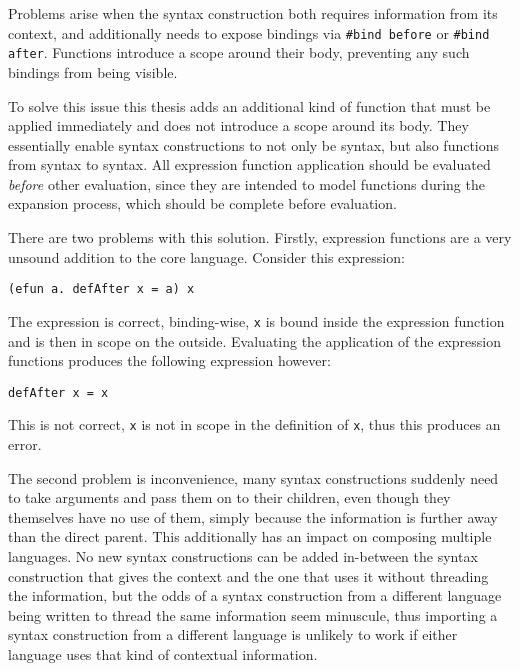 \documentclass{kththesis}
\begin{document}
Problems arise when the syntax construction both requires information from its context, and additionally needs to expose bindings via \texttt{#bind before} or \texttt{#bind after}. Functions introduce a scope around their body, preventing any such bindings from being visible.

To solve this issue this thesis adds an additional kind of function that must be applied immediately and does not introduce a scope around its body. They essentially enable syntax constructions to not only be syntax, but also functions from syntax to syntax. All expression function application should be evaluated \emph{before} other evaluation, since they are intended to model functions during the expansion process, which should be complete before evaluation.

There are two problems with this solution. Firstly, expression functions are a very unsound addition to the core language. Consider this expression:

\begin{verbatim}
(efun a. defAfter x = a) x
\end{verbatim}

The expression is correct, binding-wise, \texttt{x} is bound inside the expression function and is then in scope on the outside. Evaluating the application of the expression functions produces the following expression however:

\begin{verbatim}
defAfter x = x
\end{verbatim}

This is not correct, \texttt{x} is not in scope in the definition of \texttt{x}, thus this produces an error.

The second problem is inconvenience, many syntax constructions suddenly need to take arguments and pass them on to their children, even though they themselves have no use of them, simply because the information is further away than the direct parent. This additionally has an impact on composing multiple languages. No new syntax constructions can be added in-between the syntax construction that gives the context and the one that uses it without threading the information, but the odds of a syntax construction from a different language being written to thread the same information seem minuscule, thus importing a syntax construction from a different language is unlikely to work if either language uses that kind of contextual information.
\end{document}
